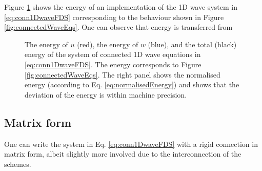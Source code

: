 Figure \ref{fig:energyConn1DWave} shows the energy of an implementation of the 1D wave system in \eqref{eq:conn1DwaveFDS} corresponding to the behaviour shown in Figure \ref{fig:connectedWaveEqs}. One can observe that energy is transferred from 
\begin{figure}[h]
    \centering
      \caption{The energy of $u$ (red), the energy of $w$ (blue), and the total (black) energy of the system of connected 1D wave equations in \eqref{eq:conn1DwaveFDS}. The energy corresponds to Figure \ref{fig:connectedWaveEqs}. The right panel shows the normalised energy (according to Eq. \eqref{eq:normalisedEnergy}) and shows that the deviation of the energy is within machine precision. \label{fig:energyConn1DWave}}
\end{figure}

\subsection{Matrix form}\label{sec:matrixFormRigid}

One can write the system in Eq. \eqref{eq:conn1DwaveFDS} with a rigid connection in matrix form, albeit slightly more involved due to the interconnection of the schemes.

